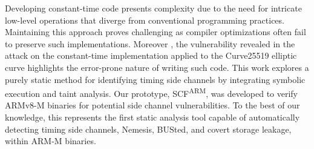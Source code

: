 Developing constant-time code presents complexity due to the need for intricate low-level operations that diverge from conventional programming practices. Maintaining this approach proves challenging as compiler optimizations often fail to preserve such implementations. Moreover , the vulnerability revealed in the attack on the constant-time implementation applied to the Curve25519 elliptic curve \cite{kaufmann2016constanttime} highlights the error-prone nature of writing such code. This work explores a purely static method for identifying timing side channels by integrating symbolic execution and taint analysis. Our prototype, \gls{SCF}\textsuperscript{ARM}, was developed to verify ARMv8-M binaries for potential side channel vulnerabilities. To the best of our knowledge, this represents the first static analysis tool capable of automatically detecting timing side channels, Nemesis, BUSted, and covert storage leakage, within ARM-M binaries.
